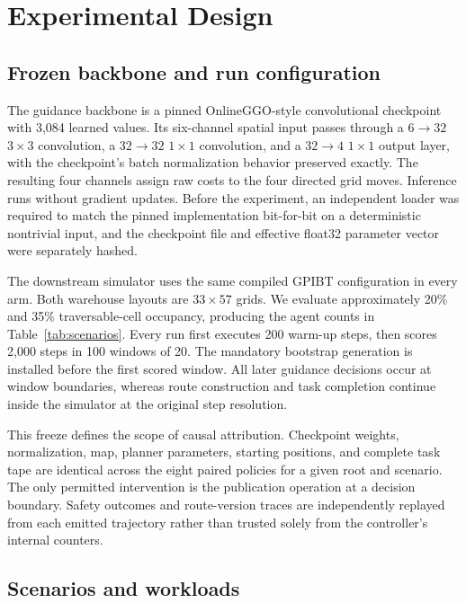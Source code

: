 \documentclass[sigconf,review,anonymous]{acmart}
\begin{document}
\section{Experimental Design}

\subsection{Frozen backbone and run configuration}

The guidance backbone is a pinned OnlineGGO-style convolutional checkpoint
with 3,084 learned values. Its six-channel spatial input passes through a
$6\!\rightarrow\!32$ $3\times3$ convolution, a
$32\!\rightarrow\!32$ $1\times1$ convolution, and a
$32\!\rightarrow\!4$ $1\times1$ output layer, with the checkpoint's batch
normalization behavior preserved exactly. The resulting four channels assign
raw costs to the four directed grid moves. Inference runs without gradient
updates. Before the experiment, an independent loader was required to match
the pinned implementation bit-for-bit on a deterministic nontrivial input,
and the checkpoint file and effective float32 parameter vector were separately
hashed.

The downstream simulator uses the same compiled GPIBT configuration in every
arm. Both warehouse layouts are $33\times57$ grids. We evaluate approximately
20\% and 35\% traversable-cell occupancy, producing the agent counts in
Table~\ref{tab:scenarios}. Every run first executes 200 warm-up steps, then
scores 2,000 steps in 100 windows of 20. The mandatory bootstrap generation is
installed before the first scored window. All later guidance decisions occur
at window boundaries, whereas route construction and task completion continue
inside the simulator at the original step resolution.

This freeze defines the scope of causal attribution. Checkpoint weights,
normalization, map, planner parameters, starting positions, and complete task
tape are identical across the eight paired policies for a given root and
scenario. The only permitted intervention is the publication operation at a
decision boundary. Safety outcomes and route-version traces are independently
replayed from each emitted trajectory rather than trusted solely from the
controller's internal counters.

\subsection{Scenarios and workloads}
\end{document}
